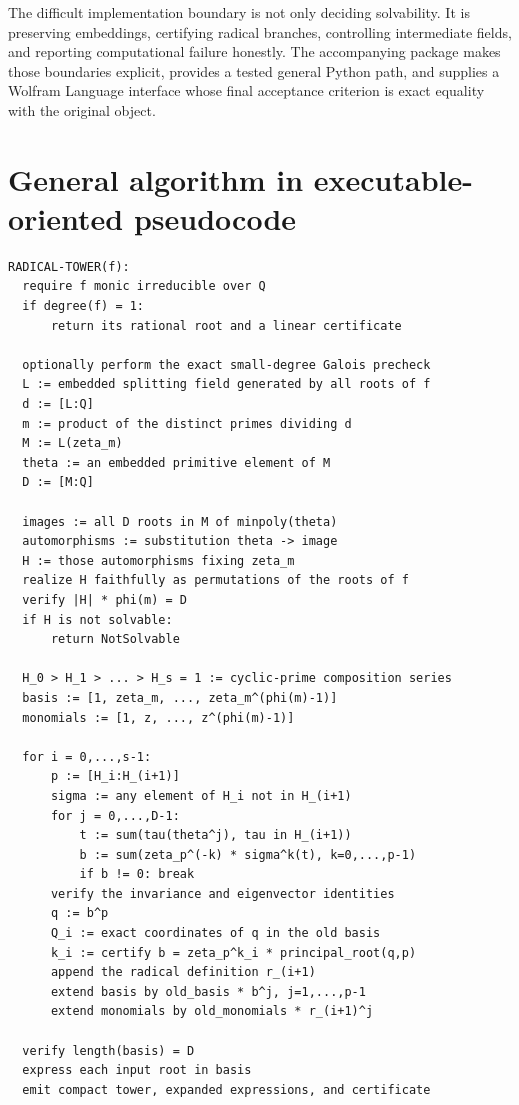 \documentclass[11pt,a4paper]{article}
\newcommand{\code}[1]{\texttt{\detokenize{#1}}}
\theoremstyle{definition}
\theoremstyle{remark}
\begin{document}
The difficult implementation boundary is not only deciding solvability. It is preserving embeddings, certifying radical branches, controlling intermediate fields, and reporting computational failure honestly. The accompanying package makes those boundaries explicit, provides a tested general Python path, and supplies a Wolfram Language interface whose final acceptance criterion is exact equality with the original \code{Root} object.

\clearpage
\appendix
\section{General algorithm in executable-oriented pseudocode}

\begin{lstlisting}[basicstyle=\footnotesize\ttfamily]
RADICAL-TOWER(f):
  require f monic irreducible over Q
  if degree(f) = 1:
      return its rational root and a linear certificate

  optionally perform the exact small-degree Galois precheck
  L := embedded splitting field generated by all roots of f
  d := [L:Q]
  m := product of the distinct primes dividing d
  M := L(zeta_m)
  theta := an embedded primitive element of M
  D := [M:Q]

  images := all D roots in M of minpoly(theta)
  automorphisms := substitution theta -> image
  H := those automorphisms fixing zeta_m
  realize H faithfully as permutations of the roots of f
  verify |H| * phi(m) = D
  if H is not solvable:
      return NotSolvable

  H_0 > H_1 > ... > H_s = 1 := cyclic-prime composition series
  basis := [1, zeta_m, ..., zeta_m^(phi(m)-1)]
  monomials := [1, z, ..., z^(phi(m)-1)]

  for i = 0,...,s-1:
      p := [H_i:H_(i+1)]
      sigma := any element of H_i not in H_(i+1)
      for j = 0,...,D-1:
          t := sum(tau(theta^j), tau in H_(i+1))
          b := sum(zeta_p^(-k) * sigma^k(t), k=0,...,p-1)
          if b != 0: break
      verify the invariance and eigenvector identities
      q := b^p
      Q_i := exact coordinates of q in the old basis
      k_i := certify b = zeta_p^k_i * principal_root(q,p)
      append the radical definition r_(i+1)
      extend basis by old_basis * b^j, j=1,...,p-1
      extend monomials by old_monomials * r_(i+1)^j

  verify length(basis) = D
  express each input root in basis
  emit compact tower, expanded expressions, and certificate
\end{lstlisting}
\end{document}
